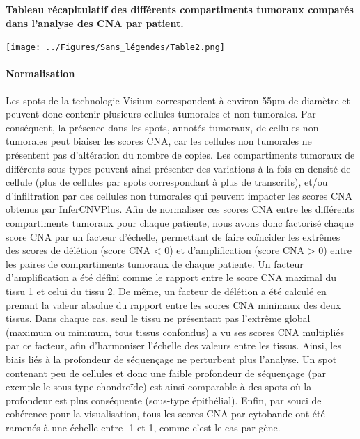 \documentclass[11pt]{article}
\begin{document}
\begin{table}[H]
    \centering
    \caption[\textbf{Table 2 : Tableau récapitulatif des différents compartiments tumoraux comparés dans l’analyse des CNA par patient.}]{\footnotesize \textbf{Tableau récapitulatif des différents compartiments tumoraux comparés dans l’analyse des CNA par patient.}}
    \texttt{[image: ../Figures/Sans\_légendes/Table2.png]}
    \label{tab:table2}
\end{table}

\paragraph{Normalisation}

Les spots de la technologie Visium correspondent à environ 55µm de diamètre et peuvent donc contenir plusieurs cellules tumorales et non tumorales. Par conséquent, la présence dans les spots, annotés tumoraux, de cellules non tumorales peut biaiser les scores CNA, car les cellules non tumorales ne présentent pas d’altération du nombre de copies. Les compartiments tumoraux de différents sous-types peuvent ainsi présenter des variations à la fois en densité de cellule (plus de cellules par spots correspondant à plus de transcrits), et/ou d’infiltration par des cellules non tumorales qui peuvent impacter les scores CNA obtenus par InferCNVPlus. Afin de normaliser ces scores CNA entre les différents compartiments tumoraux pour chaque patiente, nous avons donc factorisé chaque score CNA par un facteur d’échelle, permettant de faire coïncider les extrêmes des scores de délétion (score CNA < 0) et d’amplification (score CNA > 0) entre les paires de compartiments tumoraux de chaque patiente. Un facteur d’amplification a été défini comme le rapport entre le score CNA maximal du tissu 1 et celui du tissu 2. De même, un facteur de délétion a été calculé en prenant la valeur absolue du rapport entre les scores CNA minimaux des deux tissus. Dans chaque cas, seul le tissu ne présentant pas l’extrême global (maximum ou minimum, tous tissus confondus) a vu ses scores CNA multipliés par ce facteur, afin d’harmoniser l’échelle des valeurs entre les tissus. Ainsi, les biais liés à la profondeur de séquençage ne perturbent plus l’analyse. Un spot contenant peu de cellules et donc une faible profondeur de séquençage (par exemple le sous-type chondroïde) est ainsi comparable à des spots où la profondeur est plus conséquente (sous-type épithélial). Enfin, par souci de cohérence pour la visualisation, tous les scores CNA par cytobande ont été ramenés à une échelle entre -1 et 1, comme c’est le cas par gène.
\end{document}
